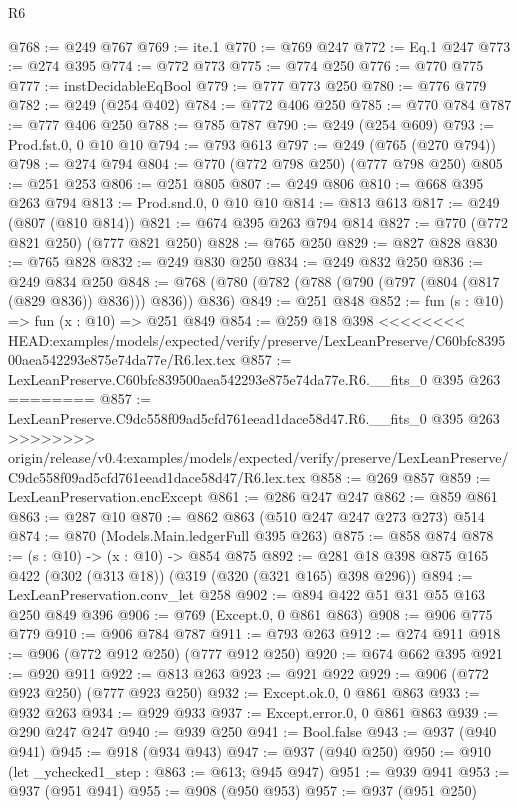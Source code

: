\begin{lexlean}{R6}
\begin{coremodule}
{{{{{{{{{{{{{{{@768 := @249 @767
@769 := ite.{1}
@770 := @769 @247
@772 := Eq.{1} @247
@773 := @274 @395
@774 := @772 @773
@775 := @774 @250
@776 := @770 @775
@777 := instDecidableEqBool
@779 := @777 @773 @250
@780 := @776 @779
@782 := @249 (@254 @402)
@784 := @772 @406 @250
@785 := @770 @784
@787 := @777 @406 @250
@788 := @785 @787
@790 := @249 (@254 @609)
@793 := Prod.fst.{0, 0} @10 @10
@794 := @793 @613
@797 := @249 (@765 (@270 @794))
@798 := @274 @794
@804 := @770 (@772 @798 @250) (@777 @798 @250)
@805 := @251 @253
@806 := @251 @805
@807 := @249 @806
@810 := @668 @395 @263 @794
@813 := Prod.snd.{0, 0} @10 @10
@814 := @813 @613
@817 := @249 (@807 (@810 @814))
@821 := @674 @395 @263 @794 @814
@827 := @770 (@772 @821 @250) (@777 @821 @250)
@828 := @765 @250
@829 := @827 @828
@830 := @765 @828
@832 := @249 @830 @250
@834 := @249 @832 @250
@836 := @249 @834 @250
@848 := @768 (@780 (@782 (@788 (@790 (@797 (@804 (@817 (@829 @836)) @836))) @836)) @836)
@849 := @251 @848
@852 := fun (s : @10) => fun (x : @10) => @251 @849
@854 := @259 @18 @398
<<<<<<<< HEAD:examples/models/expected/verify/preserve/LexLeanPreserve/C60bfc839500aea542293e875e74da77e/R6.lex.tex
@857 := LexLeanPreserve.C60bfc839500aea542293e875e74da77e.R6.__fits_0 @395 @263
========
@857 := LexLeanPreserve.C9dc558f09ad5cfd761eead1dace58d47.R6.__fits_0 @395 @263
>>>>>>>> origin/release/v0.4:examples/models/expected/verify/preserve/LexLeanPreserve/C9dc558f09ad5cfd761eead1dace58d47/R6.lex.tex
@858 := @269 @857
@859 := LexLeanPreservation.encExcept
@861 := @286 @247 @247
@862 := @859 @861
@863 := @287 @10
@870 := @862 @863 (@510 @247 @247 @273 @273) @514
@874 := @870 (Models.Main.ledgerFull @395 @263)
@875 := @858 @874
@878 := (s : @10) -> (x : @10) -> @854 @875
@892 := @281 @18 @398 @875 @165 @422 (@302 (@313 @18)) (@319 (@320 (@321 @165) @398 @296))
@894 := LexLeanPreservation.conv_let @258
@902 := @894 @422 @51 @31 @55 @163 @250 @849 @396
@906 := @769 (Except.{0, 0} @861 @863)
@908 := @906 @775 @779
@910 := @906 @784 @787
@911 := @793 @263
@912 := @274 @911
@918 := @906 (@772 @912 @250) (@777 @912 @250)
@920 := @674 @662 @395
@921 := @920 @911
@922 := @813 @263
@923 := @921 @922
@929 := @906 (@772 @923 @250) (@777 @923 @250)
@932 := Except.ok.{0, 0} @861 @863
@933 := @932 @263
@934 := @929 @933
@937 := Except.error.{0, 0} @861 @863
@939 := @290 @247 @247
@940 := @939 @250
@941 := Bool.false
@943 := @937 (@940 @941)
@945 := @918 (@934 @943)
@947 := @937 (@940 @250)
@950 := @910 (let _ychecked1_step : @863 := @613; @945 @947)
@951 := @939 @941
@953 := @937 (@951 @941)
@955 := @908 (@950 @953)
@957 := @937 (@951 @250)
}}}}}}}}}}}}}}}
\end{coremodule}
\end{lexlean}
